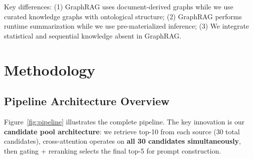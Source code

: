 \documentclass[10pt,twocolumn]{article}
\begin{document}
Key differences: (1) GraphRAG uses document-derived graphs while we use curated knowledge graphs with ontological structure; (2) GraphRAG performs runtime summarization while we use pre-materialized inference; (3) We integrate statistical and sequential knowledge absent in GraphRAG.

\section{Methodology}
\label{sec:method}

\subsection{Pipeline Architecture Overview}
\label{sec:pipeline}

Figure~\ref{fig:pipeline} illustrates the complete pipeline. The key innovation is our \textbf{candidate pool architecture}: we retrieve top-10 from each source (30 total candidates), cross-attention operates on \textbf{all 30 candidates simultaneously}, then gating + reranking selects the final top-5 for prompt construction.
\end{document}
